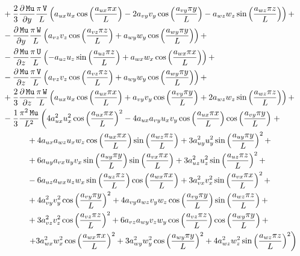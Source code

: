 \documentclass[10pt]{article}
\newcommand{\diff}[2] {\dfrac{\partial #1}{\partial #2}}
\newcommand{\U}{\,\mathtt{U}}
\newcommand{\V}{\,\mathtt{V}}
\newcommand{\W}{\,\mathtt{W}}
\newcommand{\Mu}{\,\mathtt{Mu}}
\newcommand{\DMuDy}{\diff{\Mu}{y}}
\newcommand{\DMuDz}{\diff{\Mu}{z}}
\begin{document}
\begin{equation*}
\begin{split}
  &\quad+\dfrac{2}{3} \DMuDy \dfrac{\pi \V}{L}\left(a_{ux} u_x \cos\left(\dfrac{a_{ux} \pi x}{L}\right)-2 a_{vy} v_y \cos\left(\dfrac{a_{vy} \pi y}{L}\right)-a_{wz} w_z \sin\left(\dfrac{a_{wz} \pi z}{L}\right)\right) +\\
  &\quad-\DMuDy \dfrac{\pi \W}{L}\left(a_{vz} v_z \cos\left(\dfrac{a_{vz} \pi z}{L}\right)+a_{wy} w_y \cos\left(\dfrac{a_{wy} \pi y}{L}\right)\right) +\\
  &\quad-\DMuDz \dfrac{\pi \U}{L}\left(-a_{uz} u_z \sin\left(\dfrac{a_{uz} \pi z}{L}\right)+a_{wx} w_x \cos\left(\dfrac{a_{wx} \pi x}{L}\right)\right) +\\
  &\quad-\DMuDz \dfrac{\pi \V}{L}\left(a_{vz} v_z \cos\left(\dfrac{a_{vz} \pi z}{L}\right)+a_{wy} w_y \cos\left(\dfrac{a_{wy} \pi y}{L}\right)\right) +\\
  &\quad+\dfrac{2}{3} \DMuDz \dfrac{\pi \W}{L}\left(a_{ux} u_x \cos\left(\dfrac{a_{ux} \pi x}{L}\right)+a_{vy} v_y \cos\left(\dfrac{a_{vy} \pi y}{L}\right)+2 a_{wz} w_z \sin\left(\dfrac{a_{wz} \pi z}{L}\right)\right) +\\
  &\quad-\dfrac{1}{3} \dfrac{\pi^2 \Mu}{L^2}\left(4 a_{ux}^2 u_x^2 \cos\left(\dfrac{a_{ux} \pi x}{L}\right)^2-4 a_{ux} a_{vy} u_x v_y \cos\left(\dfrac{a_{ux} \pi x}{L}\right) \cos\left(\dfrac{a_{vy} \pi y}{L}\right)\right.+\\
	&\qquad\qquad+4 a_{ux} a_{wz} u_x w_z \cos\left(\dfrac{a_{ux} \pi x}{L}\right) \sin\left(\dfrac{a_{wz} \pi z}{L}\right)+3 a_{uy}^2 u_y^2 \sin\left(\dfrac{a_{uy} \pi y}{L}\right)^2+\\
	&\qquad\qquad+6 a_{uy} a_{vx} u_y v_x \sin\left(\dfrac{a_{uy} \pi y}{L}\right) \sin\left(\dfrac{a_{vx} \pi x}{L}\right)+3 a_{uz}^2 u_z^2 \sin\left(\dfrac{a_{uz} \pi z}{L}\right)^2+\\
	&\qquad\qquad-6 a_{uz} a_{wx} u_z w_x \sin\left(\dfrac{a_{uz} \pi z}{L}\right) \cos\left(\dfrac{a_{wx} \pi x}{L}\right)+3 a_{vx}^2 v_x^2 \sin\left(\dfrac{a_{vx} \pi x}{L}\right)^2+\\
	&\qquad\qquad+4 a_{vy}^2 v_y^2 \cos\left(\dfrac{a_{vy} \pi y}{L}\right)^2+4 a_{vy} a_{wz} v_y w_z \cos\left(\dfrac{a_{vy} \pi y}{L}\right) \sin\left(\dfrac{a_{wz} \pi z}{L}\right)+\\
	&\qquad\qquad+3 a_{vz}^2 v_z^2 \cos\left(\dfrac{a_{vz} \pi z}{L}\right)^2+6 a_{vz} a_{wy} v_z w_y \cos\left(\dfrac{a_{vz} \pi z}{L}\right) \cos\left(\dfrac{a_{wy} \pi y}{L}\right)+\\
	&\qquad\qquad\left.+3 a_{wx}^2 w_x^2 \cos\left(\dfrac{a_{wx} \pi x}{L}\right)^2+3 a_{wy}^2 w_y^2 \cos\left(\dfrac{a_{wy} \pi y}{L}\right)^2+4 a_{wz}^2 w_z^2 \sin\left(\dfrac{a_{wz} \pi z}{L}\right)^2\right)  \\ \vspace{15pt}

\end{split}
\end{equation*}
\end{document}
